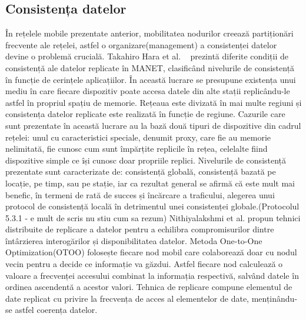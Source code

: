\documentclass[12pt,a4paper]{report}
\begin{document}
\subsection{Consistența datelor}
În rețelele mobile prezentate anterior, mobilitatea nodurilor creează partiționări frecvente ale rețelei, astfel o organizare(management) a consistenței datelor devine o problemă crucială. Takahiro Hara et al. ~\cite{hara2009consistency} prezintă diferite condiții de consistență ale datelor replicate în MANET, clasificând nivelurile de consistență în funcție de cerințele aplicațiilor. În această lucrare se presupune existența unui mediu în care fiecare dispozitiv poate accesa datele din alte stații replicându-le astfel în propriul spațiu de memorie. Rețeaua este divizată în mai multe regiuni și consistența datelor replicate este realizată în funcție de regiune. Cazurile care sunt prezentate în această lucrare au la bază două tipuri de dispozitive din cadrul rețelei: unul cu caracteristici speciale, denumit proxy, care fie au memorie nelimitată, fie cunosc cum sunt împărțite replicile în rețea,  celelalte fiind dispozitive simple ce își cunosc doar propriile replici. Nivelurile de consistență prezentate sunt caracterizate de: consistență globală, consistență bazată pe locație, pe timp, sau pe stație, iar ca rezultat general se afirmă că este mult mai benefic, în termeni de rată de succes și încărcare a traficului, alegerea unui protocol de consistență locală în detrimentul unei consistenței globale.(Protocolul 5.3.1 - e mult de scris nu stiu cum sa rezum)
Nithiyalakshmi et al.\cite{nithiyalakshmi2014data} propun tehnici distribuite de replicare a datelor pentru a echilibra compromisurilor dintre întârzierea interogărilor și disponibilitatea datelor. Metoda One-to-One Optimization(OTOO) folosește fiecare nod mobil care colaborează doar cu nodul vecin pentru a decide ce informație va găzdui. Astfel fiecare nod calculează o valoare a frecvenței accesului combinat la informația respectivă, salvând datele în ordinea ascendentă a acestor valori. Tehnica de replicare compune elementul de date replicat cu privire la frecvența de acces al elementelor de date, menținându-se astfel coerența datelor.
\end{document}
